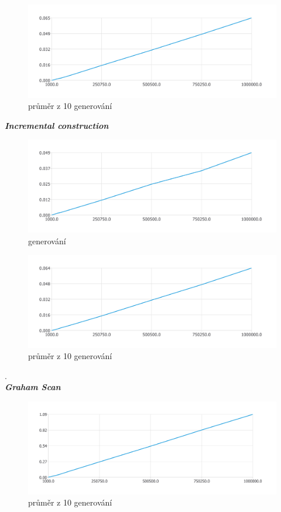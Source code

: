 \documentclass{article}
\begin{document}
\begin{figure}[htbp]
\centering
        \includegraphics[clip, trim=0cm 0cm 0cm 0cm, width=1\textwidth]{grq.pdf}
        \caption{průměr z 10 generování}
\end{figure}
\clearpage
\newpage
\textit{\textbf {Incremental construction}}
\\
\begin{figure}[htbp]
\centering
        \includegraphics[clip, trim=0cm 0cm 0cm 0cm, width=1\textwidth]{pdf16.pdf}
        \caption{generování}
\end{figure}
\begin{figure}[htbp]
\centering
        \includegraphics[clip, trim=0cm 0cm 0cm 0cm, width=1\textwidth]{gri.pdf}
        \caption{průměr z 10 generování}
\end{figure}
.\\
\bigskip
\clearpage
\newpage
\textit{\textbf {Graham Scan}}
\\
\begin{figure}[htbp]
\centering
        \includegraphics[clip, trim=0cm 0cm 0cm 0cm, width=1\textwidth]{ggs.pdf}
        \caption{průměr z 10 generování}
\end{figure}
\clearpage
\newpage
\end{document}
